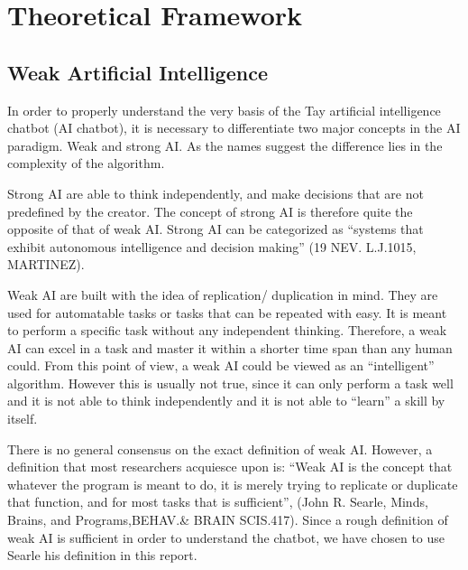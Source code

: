 \chapter{Theoretical Framework}

\section{Weak Artificial Intelligence}
In order to properly understand the very basis of the Tay artificial intelligence chatbot (AI chatbot), it is necessary to differentiate two major concepts in the AI paradigm. Weak and strong AI. As the names suggest the difference lies in the complexity of the algorithm.

Strong AI are able to think independently, and make decisions that are not predefined by the creator. The concept of strong AI is therefore quite the opposite of that of weak AI. Strong AI can be categorized as “systems that exhibit autonomous intelligence and decision making” (19 NEV. L.J.1015, MARTINEZ).

Weak AI are built with the idea of replication/ duplication in mind. They are used for automatable tasks or tasks that can be repeated with easy. It is meant to perform a specific task without any independent thinking. Therefore, a weak AI can excel in a task and master it within a shorter time span than any human could. From this point of view, a weak AI could be viewed as an “intelligent” algorithm. However this is usually not true, since it can only perform a task well and it is not able to think independently and it is not able to “learn” a skill by itself.

There is no general consensus on the exact definition of weak AI. However, a definition that most researchers acquiesce upon is: “Weak AI is the concept that whatever the program is meant to do, it is merely trying to replicate or duplicate that function, and for most tasks that is sufficient”, (John R. Searle, Minds, Brains, and Programs,BEHAV.\& BRAIN SCIS.417). Since a rough definition of weak AI is sufficient in order to understand the chatbot, we have chosen to use Searle his definition in this report.

\newpage

